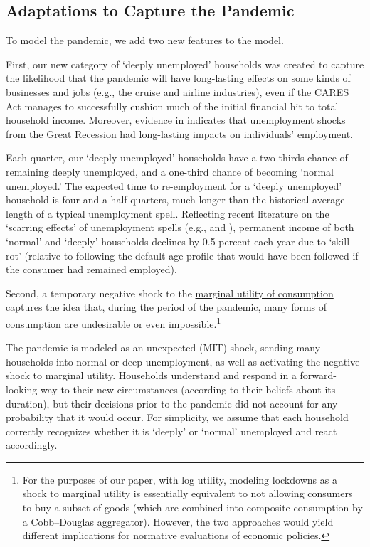 \documentclass[titlepage,letterpaper]{\econtex}
\begin{document}
\subsection{Adaptations to Capture the Pandemic}

To model the pandemic, we add two new features to the model.

First, our new category of `deeply unemployed' households was created to capture the likelihood that the pandemic will have long-lasting effects on some kinds of businesses and jobs (e.g., the cruise and airline industries), even if the CARES Act manages to successfully cushion much of the initial financial hit to total household income.  Moreover, evidence in \cite{yagan_hysteresis} indicates that unemployment shocks from the Great Recession had long-lasting impacts on individuals' employment.

Each quarter, our `deeply unemployed' households have a two-thirds chance of remaining deeply unemployed, and a one-third chance of becoming `normal unemployed.'
The expected time to re-employment for a `deeply unemployed' household is four and a half quarters, much longer than the historical average length of a typical unemployment spell.
Reflecting recent literature on the `scarring effects' of unemployment spells (e.g., \cite{wachter_scarring} and \cite{hpv:cycleTrend}), permanent income of both `normal' and `deeply' households declines by 0.5 percent each year due to `skill rot' (relative to following the default age profile that would have been followed if the consumer had remained employed).

Second, a temporary negative shock to the \href{https://www.investopedia.com/terms/m/marginalutility.asp}{marginal utility of consumption} captures the idea that, during the period of the pandemic, many forms of consumption are undesirable or even impossible.\footnote{For the purposes of our paper, with log utility, modeling lockdowns as a shock to marginal utility is essentially equivalent to not allowing consumers to buy a subset of goods (which are combined into composite consumption by a Cobb--Douglas aggregator). However, the two approaches would yield different implications for normative evaluations of economic policies.}

The pandemic is modeled as an unexpected (MIT) shock, sending many households into normal or deep unemployment, as well as activating the negative shock to marginal utility. Households understand and respond in a forward-looking way to their new circumstances (according to their beliefs about its duration), but their decisions prior to the pandemic did not account for any probability that it would occur.  For simplicity, we assume that each household correctly recognizes whether it is `deeply' or `normal' unemployed and react accordingly.
\end{document}
